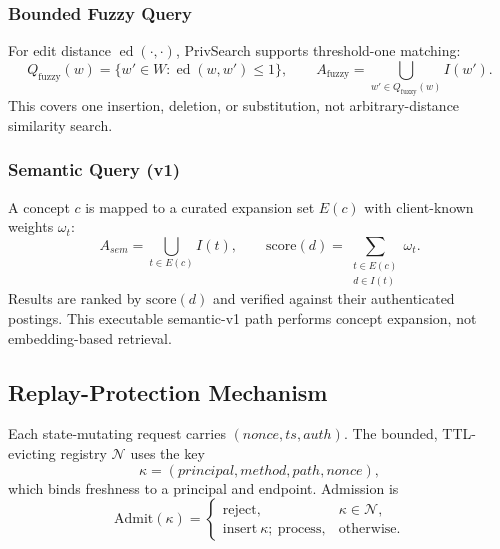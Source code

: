 \documentclass[journal]{IEEEtran}
\theoremstyle{tight}
\theoremstyle{remark}
\theoremstyle{plain}
\begin{document}
\subsubsection{Bounded Fuzzy Query}
\label{3C5}

For edit distance \(\operatorname{ed}(\cdot,\cdot)\), PrivSearch supports threshold-one matching:
\begin{equation}
Q_{\mathrm{fuzzy}}(w)=
\{w'\in W:\operatorname{ed}(w,w')\leq1\},
\qquad
A_{\mathrm{fuzzy}}=
\bigcup_{w'\in Q_{\mathrm{fuzzy}}(w)}I(w').
\label{eq:qfuzzy}
\end{equation}
This covers one insertion, deletion, or substitution, not arbitrary-distance similarity search.

\subsubsection{Semantic Query (v1)}
\label{3C6}

A concept \(c\) is mapped to a curated expansion set \(E(c)\) with client-known weights \(\omega_t\):
\begin{equation}
A_{sem}=\bigcup_{t\in E(c)}I(t),\qquad
\mathrm{score}(d)=
\sum_{\substack{t\in E(c)\\d\in I(t)}}\omega_t.
\label{eq:qsem}
\end{equation}
Results are ranked by \(\mathrm{score}(d)\) and verified against their authenticated postings. This executable semantic-v1 path performs concept expansion, not embedding-based retrieval.

\subsection{Replay-Protection Mechanism}
\label{3D}

Each state-mutating request carries
\((\mathit{nonce},\mathit{ts},\mathit{auth})\).
The bounded, TTL-evicting registry \(\mathcal{N}\) uses the key
\begin{equation}
\kappa=(\mathit{principal},\mathit{method},
\mathit{path},\mathit{nonce}),
\label{eq:noncekey}
\end{equation}
which binds freshness to a principal and endpoint. Admission is
\begin{equation}
\mathrm{Admit}(\kappa)=
\begin{cases}
\mathrm{reject}, & \kappa\in\mathcal{N},\\
\mathrm{insert}\ \kappa;\ \mathrm{process}, & \text{otherwise}.
\end{cases}
\label{eq:admit}
\end{equation}
\end{document}
